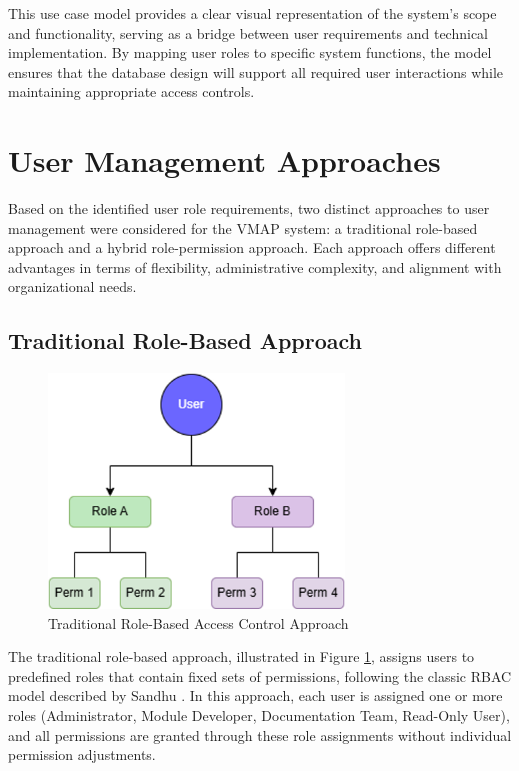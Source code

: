 This use case model provides a clear visual representation of the system's scope and functionality, serving as a bridge between user requirements and technical implementation. By mapping user roles to specific system functions, the model ensures that the database design will support all required user interactions while maintaining appropriate access controls.

\section{User Management Approaches}
\label{sec:user-management-approaches}

Based on the identified user role requirements, two distinct approaches to user management were considered for the \ac{VMAP} system: a traditional role-based approach and a hybrid role-permission approach. Each approach offers different advantages in terms of flexibility, administrative complexity, and alignment with organizational needs.

\subsection{Traditional Role-Based Approach}
\label{subsec:traditional-role-approach}

\begin{figure}[h]
    \centering
    \includegraphics[width=0.7\textwidth]{figures/traditional_rbac_model.png}
    \caption{Traditional Role-Based Access Control Approach}
    \label{fig:traditional-rbac}
\end{figure}

The traditional role-based approach, illustrated in Figure \ref{fig:traditional-rbac}, assigns users to predefined roles that contain fixed sets of permissions, following the classic \ac{RBAC} model described by Sandhu \cite{sandhu1998role}. In this approach, each user is assigned one or more roles (Administrator, Module Developer, Documentation Team, Read-Only User), and all permissions are granted through these role assignments without individual permission adjustments.

